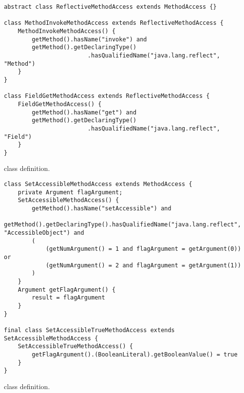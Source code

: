 \begin{listing}
\begin{verbatim}	
abstract class ReflectiveMethodAccess extends MethodAccess {}

class MethodInvokeMethodAccess extends ReflectiveMethodAccess {
	MethodInvokeMethodAccess() {
		getMethod().hasName("invoke") and
		getMethod().getDeclaringType()
						.hasQualifiedName("java.lang.reflect", "Method")
	}
}

class FieldGetMethodAccess extends ReflectiveMethodAccess {
	FieldGetMethodAccess() {
		getMethod().hasName("get") and
		getMethod().getDeclaringType()
						.hasQualifiedName("java.lang.reflect", "Field")
	}
}
\end{verbatim}
\caption{ class definition.}
\label{lst:ql:ReflectiveMethodAccess}
\end{listing}

\begin{listing}
\begin{verbatim}
class SetAccessibleMethodAccess extends MethodAccess {
	private Argument flagArgument;
	SetAccessibleMethodAccess() {
		getMethod().hasName("setAccessible") and
		getMethod().getDeclaringType().hasQualifiedName("java.lang.reflect", "AccessibleObject") and
		(
			(getNumArgument() = 1 and flagArgument = getArgument(0)) or
			(getNumArgument() = 2 and flagArgument = getArgument(1))
		)
	}	
	Argument getFlagArgument() {
		result = flagArgument
	}
}

final class SetAccessibleTrueMethodAccess extends SetAccessibleMethodAccess {
	SetAccessibleTrueMethodAccess() {
		getFlagArgument().(BooleanLiteral).getBooleanValue() = true
	}
}
\end{verbatim}
\caption{ class definition.}
\label{lst:ql:SetAccessibleTrueMethodAccess}
\end{listing}
